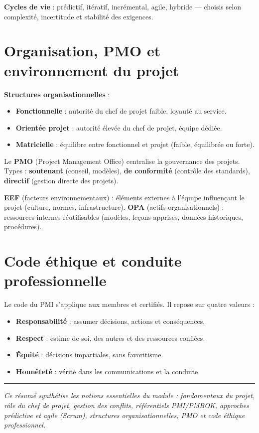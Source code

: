 \documentclass[11pt,a4paper]{article}
\begin{document}
\textbf{Cycles de vie} : prédictif, itératif, incrémental, agile, hybride --- choisis selon complexité, incertitude et stabilité des exigences.

\section{Organisation, PMO et environnement du projet}

\textbf{Structures organisationnelles} :
\begin{itemize}
    \item \textbf{Fonctionnelle} : autorité du chef de projet faible, loyauté au service.
    \item \textbf{Orientée projet} : autorité élevée du chef de projet, équipe dédiée.
    \item \textbf{Matricielle} : équilibre entre fonctionnel et projet (faible, équilibrée ou forte).
\end{itemize}

Le \textbf{PMO} (Project Management Office) centralise la gouvernance des projets. Types : \textbf{soutenant} (conseil, modèles), \textbf{de conformité} (contrôle des standards), \textbf{directif} (gestion directe des projets).

\textbf{EEF} (facteurs environnementaux) : éléments externes à l'équipe influençant le projet (culture, normes, infrastructure). \textbf{OPA} (actifs organisationnels) : ressources internes réutilisables (modèles, leçons apprises, données historiques, procédures).

\section{Code éthique et conduite professionnelle}

Le code du PMI s'applique aux membres et certifiés. Il repose sur quatre valeurs :
\begin{itemize}
    \item \textbf{Responsabilité} : assumer décisions, actions et conséquences.
    \item \textbf{Respect} : estime de soi, des autres et des ressources confiées.
    \item \textbf{Équité} : décisions impartiales, sans favoritisme.
    \item \textbf{Honnêteté} : vérité dans les communications et la conduite.
\end{itemize}

\vspace{0.6em}
\hrule
\vspace{0.4em}
\noindent\textit{Ce résumé synthétise les notions essentielles du module : fondamentaux du projet, rôle du chef de projet, gestion des conflits, référentiels PMI/PMBOK, approches prédictive et agile (Scrum), structures organisationnelles, PMO et code éthique professionnel.}
\end{document}
